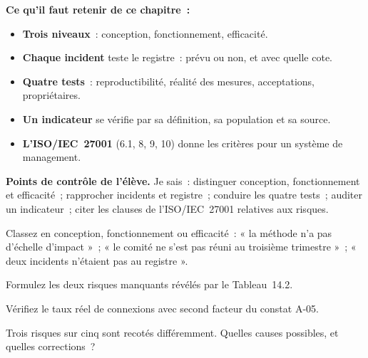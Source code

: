 \separateur

\begin{boxresume}
\textbf{Ce qu'il faut retenir de ce chapitre~:}
\begin{itemize}
    \item \textbf{Trois niveaux}~: conception, fonctionnement, efficacité.
    \item \textbf{Chaque incident} teste le registre~: prévu ou non, et
          avec quelle cote.
    \item \textbf{Quatre tests}~: reproductibilité, réalité des mesures,
          acceptations, propriétaires.
    \item \textbf{Un indicateur} se vérifie par sa définition, sa
          population et sa source.
    \item \textbf{L'ISO/IEC~27001} (6.1, 8, 9, 10) donne les critères pour un
          système de management.
\end{itemize}
\end{boxresume}

\begin{boxinfo}
\textbf{Points de contrôle de l'élève.} Je sais~: distinguer conception,
fonctionnement et efficacité~; rapprocher incidents et registre~; conduire
les quatre tests~; auditer un indicateur~; citer les clauses de
l'ISO/IEC~27001 relatives aux risques.
\end{boxinfo}

\bigskip

\begin{boxexo}[title={\ding{45}\quad Exercice~14.1. Quel niveau~? \niveaubase}]
Classez en conception, fonctionnement ou efficacité~: « la méthode n'a pas
d'échelle d'impact »~; « le comité ne s'est pas réuni au troisième
trimestre »~; « deux incidents n'étaient pas au registre ».
\end{boxexo}

\begin{boxexo}[title={\ding{45}\quad Exercice~14.2. Trous \niveaubase}]
Formulez les deux risques manquants révélés par le Tableau~14.2.
\end{boxexo}

\begin{boxexo}[title={\ding{45}\quad Exercice~14.3. Recalculer \niveaubase}]
Vérifiez le taux réel de connexions avec second facteur du constat A-05.
\end{boxexo}

\begin{boxexo}[title={\ding{45}\quad Exercice~14.4. Reproductibilité \niveaumoyen}]
Trois risques sur cinq sont recotés différemment. Quelles causes
possibles, et quelles corrections~?
\end{boxexo}

